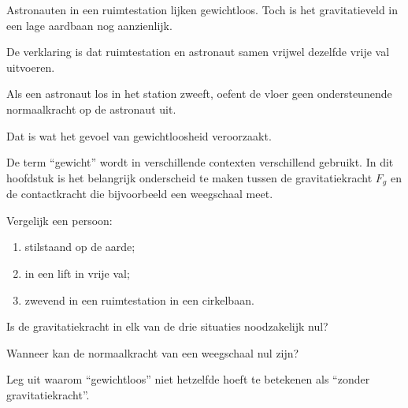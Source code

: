 \documentclass{ximera}
\begin{document}


Astronauten in een ruimtestation lijken gewichtloos. Toch is het
gravitatieveld in een lage aardbaan nog aanzienlijk.

De verklaring is dat ruimtestation en astronaut samen vrijwel dezelfde
vrije val uitvoeren.

Als een astronaut los in het station zweeft, oefent de vloer geen
ondersteunende normaalkracht op de astronaut uit.

Dat is wat het gevoel van gewichtloosheid veroorzaakt.

\begin{opmerking}
De term ``gewicht'' wordt in verschillende contexten verschillend
gebruikt. In dit hoofdstuk is het belangrijk onderscheid te maken tussen
de gravitatiekracht $F_g$ en de contactkracht die bijvoorbeeld een
weegschaal meet.
\end{opmerking}


\begin{oefening}{\oefU\ESS}

Vergelijk een persoon:

\begin{enumerate}
  \item stilstaand op de aarde;
  \item in een lift in vrije val;
  \item zwevend in een ruimtestation in een cirkelbaan.
\end{enumerate}

\begin{question}
Is de gravitatiekracht in elk van de drie situaties noodzakelijk nul?
\end{question}

\begin{question}
Wanneer kan de normaalkracht van een weegschaal nul zijn?
\end{question}

\begin{question}
Leg uit waarom ``gewichtloos'' niet hetzelfde hoeft te betekenen als
``zonder gravitatiekracht''.
\end{question}

\end{oefening}


\end{document}
